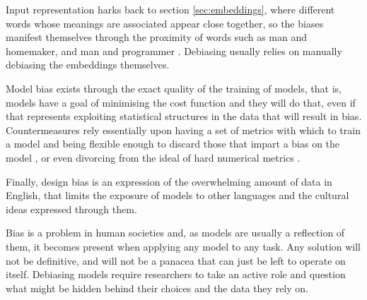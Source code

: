 Input representation harks back to section \ref{sec:embeddings}, where different words whose meanings are associated appear close together, so the biases manifest themselves through the proximity of words such as man and homemaker, and man and programmer \cite{bolukbasi_man_2016}. Debiasing usually relies on manually debiasing the embeddings themselves.

Model bias exists through the exact quality of the training of models, that is, models have a goal of minimising the cost function and they will do that, even if that represents exploiting statistical structures in the data that will result in bias. Countermeasures rely essentially upon having a set of metrics with which to train a model and being flexible enough to discard those that impart a bias on the model \cite{hovy_five_2021}, or even divorcing from the ideal of hard numerical metrics \cite{ribeiro_beyond_2020}.

Finally, design bias is an expression of the overwhelming amount of data in English, that limits the exposure of models to other languages and the cultural ideas expressed through them.

Bias is a problem in human societies and, as models are usually a reflection of them, it becomes present when applying any model to any task. Any solution will not be definitive, and will not be a panacea that can just be left to operate on itself. Debiasing models require researchers to take an active role and question what might be hidden behind their choices and the data they rely on.